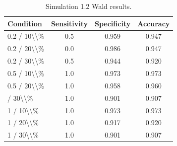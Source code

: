 \begin{table}[!h]
\centering
\caption{\label{tab:tab:sim12_wald}Simulation 1.2 Wald results.}
\centering
\begin{tabular}[t]{lccc}
\toprule
Condition & Sensitivity & Specificity & Accuracy\\
\midrule
0.2 / 10\textbackslash{}\textbackslash{}\% & 0.5 & 0.959 & 0.947\\
0.2 / 20\textbackslash{}\textbackslash{}\% & 0.0 & 0.986 & 0.947\\
0.2 / 30\textbackslash{}\textbackslash{}\% & 0.5 & 0.944 & 0.920\\
0.5 / 10\textbackslash{}\textbackslash{}\% & 1.0 & 0.973 & 0.973\\
0.5 / 20\textbackslash{}\textbackslash{}\% & 1.0 & 0.958 & 0.960\\
\addlinespace
0.5 / 30\textbackslash{}\textbackslash{}\% & 1.0 & 0.901 & 0.907\\
1 / 10\textbackslash{}\textbackslash{}\% & 1.0 & 0.973 & 0.973\\
1 / 20\textbackslash{}\textbackslash{}\% & 1.0 & 0.917 & 0.920\\
1 / 30\textbackslash{}\textbackslash{}\% & 1.0 & 0.901 & 0.907\\
\bottomrule
\end{tabular}
\end{table}
